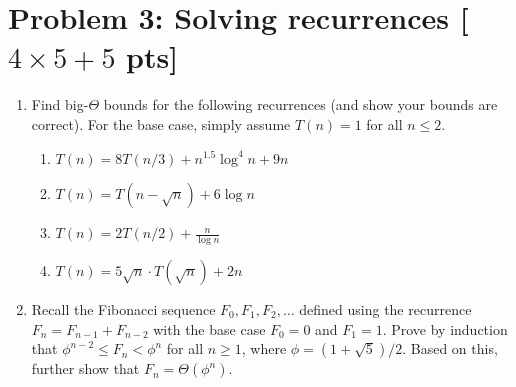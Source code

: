 \documentclass[letterpaper, 11pt]{article}
\newcommand{\1}{\mathds{1}}	%
\theoremstyle{definition}
\newcommand{\problem}[1]{\section*{Problem #1}}
\begin{document}
\problem{3: Solving recurrences [$4 \times 5+5$ pts]}
\begin{enumerate}
    \item Find big-$\Theta$ bounds for the following recurrences (and show your bounds are correct). For the base case, simply assume $T(n) = 1$ for all $n \leq 2$.
    \begin{enumerate}
        \item $T(n)=8T(n/3)+n^{1.5} \log^4 n + 9n$
        \item $T(n)=T(n-\sqrt{n}) + 6 \log n$
        \item $T(n)=2T(n/2)+ \frac{n}{\log n}$
        \item $T(n)= 5\sqrt{n} \cdot T(\sqrt{n}) + 2n$
    \end{enumerate}
    \item Recall the Fibonacci sequence $F_0,F_1,F_2,\dots$ defined using the recurrence $F_n = F_{n-1}+F_{n-2}$ with the base case $F_0 = 0$ and $F_1 = 1$. Prove by induction that $\phi^{n-2} \leq F_n < \phi^n$ for all $n \geq 1$, where $\phi = (1+\sqrt{5})/2$.
    Based on this, further show that $F_n = \Theta(\phi^n)$.
\end{enumerate}
\end{document}
